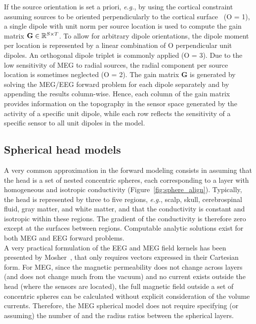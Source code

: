 If the source orientation is set a priori, \textit{e.g.}, by using the cortical constraint assuming sources to be oriented perpendicularly to the cortical surface~\cite{Dale:1993} (O = 1), a single dipole with unit norm per source location is used to compute the gain matrix $\mathbf{G}\in\mathbb{R}^{S\times T}$. To allow for arbitrary dipole orientations, the dipole moment per location is represented by a linear combination of O perpendicular unit dipoles. An orthogonal dipole triplet is commonly applied (O = 3). Due to the low sensitivity of MEG to radial sources, the radial component per source location is sometimes neglected (O = 2). The gain matrix $\mathbf{G}$ is generated by solving the MEG/EEG forward problem for each dipole separately and by appending the results column-wise. Hence, each column of the gain matrix provides information on the topography in the sensor space generated by the activity of a specific unit dipole, while each row reflects the sensitivity of a specific sensor to all unit dipoles in the model.

\subsection*{Spherical head models}
A very common approximation in the forward modeling consists in assuming that the head is a set of nested concentric spheres, each corresponding to a layer with homogeneous and isotropic conductivity (Figure~\ref{fig:sphere_align}). Typically, the head is represented by three to five regions, \textit{e.g.}, scalp, skull, cerebrospinal fluid, gray matter, and white matter, and that the conductivity is constant and isotropic within these regions. The gradient of the conductivity is therefore zero except at the surfaces between regions. Computable analytic solutions exist for both MEG and EEG forward problems.\\

A very practical formulation of the EEG and MEG field kernels has been presented by Mosher~\cite{mosher1999eeg}, that only requires vectors expressed in their Cartesian form. For MEG, since the magnetic permeability does not change across layers (and does not change much from the vacuum) and no current exists outside the head (where the sensors are located), the full magnetic field outside a set of concentric spheres can be calculated without explicit consideration of the volume currents. Therefore, the MEG spherical model does not require specifying (or assuming) the number of and the radius ratios between the spherical layers.\\

